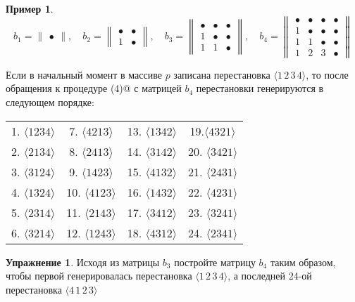 \documentclass[12pt,a4paper]{article}
\theoremstyle{plain}
\theoremstyle{definition}
\newtheorem*{task}{Упражнение}
\newtheorem*{example}{Пример}
\theoremstyle{remark}
\begin{document}
\begin{example}
\[ b_1 = \begin{Vmatrix} \bullet \end{Vmatrix},\quad
b_2 = \begin{Vmatrix} \bullet & \bullet \\ 1 & \bullet \end{Vmatrix},\quad
b_3 = \begin{Vmatrix} \bullet & \bullet & \bullet \\ 1 & \bullet & \bullet \\ 1 & 1 & \bullet \end{Vmatrix},\quad
b_4 = \begin{Vmatrix} \bullet & \bullet & \bullet & \bullet \\ 1 & \bullet & \bullet & \bullet \\ 1 & 1 & \bullet & \bullet \\ 1 & 2 & 3 & \bullet \end{Vmatrix}
\]

Если в начальный момент в массиве $p$ записана перестановка $\langle 1\,2\,3\,4\rangle$, то после обращения к процедуре \verb@PERM(4)@ с матрицей $b_4$ перестановки генерируются в следующем порядке:

\begin{tabular}{cccc}
1. $\langle1 2 3 4\rangle$ & 7. $\langle4 2 1 3\rangle$ & 13. $\langle1 3 4 2\rangle$ & 19.$\langle 4 3 2 1\rangle$ \\
2. $\langle2 1 3 4\rangle$ & 8. $\langle2 4 1 3\rangle$ & 14. $\langle3 1 4 2\rangle$ & 20. $\langle3 4 2 1\rangle$ \\
3. $\langle3 1 2 4\rangle$ & 9. $\langle1 4 2 3\rangle$ & 15. $\langle4 1 3 2\rangle$ & 21. $\langle2 4 3 1\rangle$ \\
4. $\langle1 3 2 4\rangle$ & 10. $\langle4 1 2 3\rangle$ & 16. $\langle1 4 3 2\rangle$ & 22. $\langle4 2 3 1\rangle$ \\
5. $\langle2 3 1 4\rangle$ & 11. $\langle2 1 4 3\rangle$ & 17. $\langle3 4 1 2\rangle$ & 23. $\langle3 2 4 1\rangle$ \\
6. $\langle3 2 1 4\rangle$ & 12. $\langle1 2 4 3\rangle$ & 18. $\langle4 3 1 2\rangle$ & 24. $\langle2 3 4 1\rangle$
\end{tabular}
\end{example}

\begin{task}
Исходя из матрицы $b_3$ постройте матрицу $b_4$ таким образом, чтобы первой генерировалась перестановка $\langle 1\,2\,3\,4 \rangle$, а последней 24-ой перестановка $\langle 4\,1\,2\,3\rangle$
\end{task}
\end{document}
